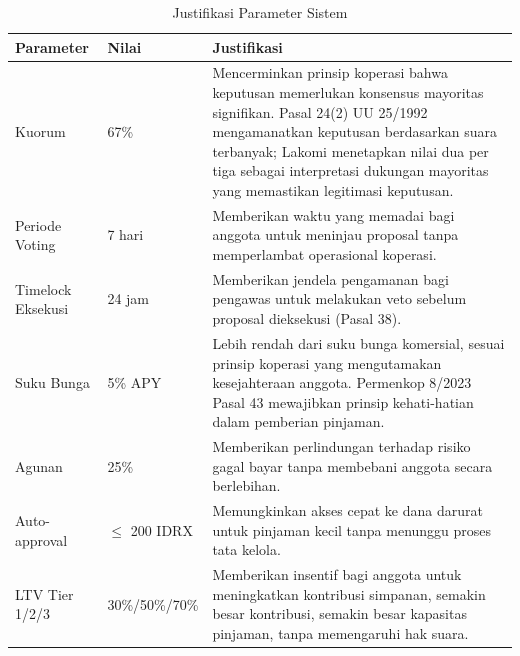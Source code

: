 \begin{table}[H]
\centering
\caption{Justifikasi Parameter Sistem}
\label{tab:parameter}
\footnotesize
\begin{tabular}{p{}p{}p{}}
\toprule
\textbf{Parameter} & \textbf{Nilai} & \textbf{Justifikasi} \\
\midrule
Kuorum & 67\% & Mencerminkan prinsip koperasi bahwa keputusan memerlukan konsensus mayoritas signifikan. Pasal 24(2) UU 25/1992 mengamanatkan keputusan berdasarkan suara terbanyak; Lakomi menetapkan nilai dua per tiga sebagai interpretasi dukungan mayoritas yang memastikan legitimasi keputusan. \\
\addlinespace
Periode Voting & 7 hari & Memberikan waktu yang memadai bagi anggota untuk meninjau proposal tanpa memperlambat operasional koperasi. \\
\addlinespace
Timelock Eksekusi & 24 jam & Memberikan jendela pengamanan bagi pengawas untuk melakukan veto sebelum proposal dieksekusi (Pasal 38). \\
\addlinespace
Suku Bunga & 5\% APY & Lebih rendah dari suku bunga komersial, sesuai prinsip koperasi yang mengutamakan kesejahteraan anggota. Permenkop 8/2023 Pasal 43 mewajibkan prinsip kehati-hatian dalam pemberian pinjaman. \\
\addlinespace
Agunan & 25\% & Memberikan perlindungan terhadap risiko gagal bayar tanpa membebani anggota secara berlebihan. \\
\addlinespace
Auto-approval & $\leq$ 200 IDRX & Memungkinkan akses cepat ke dana darurat untuk pinjaman kecil tanpa menunggu proses tata kelola. \\
\addlinespace
LTV Tier 1/2/3 & 30\%/50\%/70\% & Memberikan insentif bagi anggota untuk meningkatkan kontribusi simpanan, semakin besar kontribusi, semakin besar kapasitas pinjaman, tanpa memengaruhi hak suara. \\
\bottomrule
\end{tabular}
\end{table}

